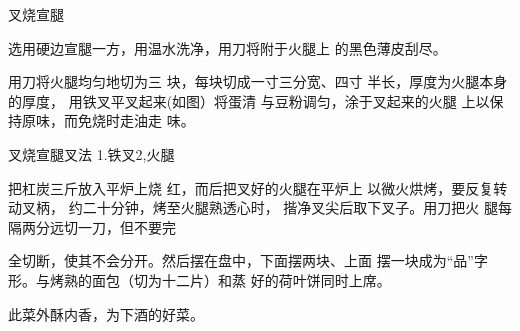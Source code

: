 \begin{recipe}{叉烧宣腿}

\ingredients


\cooking

\step 选用硬边宣腿一方，用温水洗净，用刀将附于火腿上 的黑色薄皮刮尽。

\step 用刀将火腿均匀地切为三 块，每块切成一寸三分宽、四寸 半长，厚度为火腿本身的厚度， 用铁叉平叉起来(如图）将蛋清 与豆粉调匀，涂于叉起来的火腿 上以保持原味，而免烧时走油走 味。

叉烧宣腿叉法 1.铁叉2,火腿

\step 把杠炭三斤放入平炉上烧 红，而后把叉好的火腿在平炉上 以微火烘烤，要反复转动叉柄， 约二十分钟，烤至火腿熟透心时， 揩净叉尖后取下叉子。用刀把火 腿每隔两分远切一刀，但不要完

全切断，使其不会分开。然后摆在盘中，下面摆两块、上面 摆一块成为“品”字形。与烤熟的面包（切为十二片）和蒸 好的荷叶饼同时上席。

\notes

此菜外酥内香，为下酒的好菜。

\end{recipe}

